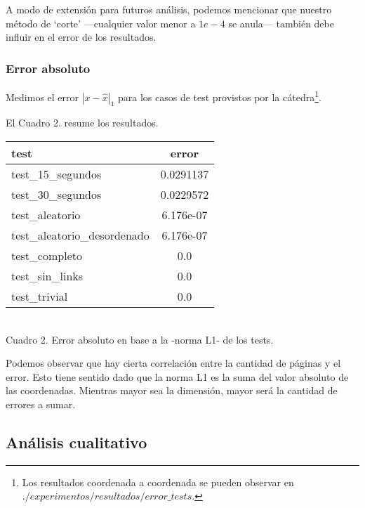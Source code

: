 \vspace{1em}
A modo de extensión para futuros análisis, podemos mencionar que nuestro método de `corte' ---cualquier valor menor a $1e-4$ se anula--- también debe influir en el error de los resultados. 


\vspace{2em}
\subsubsection{Error absoluto} Medimos el error $|x - \hat{x}|_1$ para los casos de test provistos por la cátedra\footnote{Los resultados coordenada a coordenada se pueden observar en $./experimentos/resultados/error\_tests$.}. 
\vspace{1em}

\noindent El Cuadro 2. resume los resultados.
\vspace{1.5em}

\begin{center}
    \begin{tabular}{ |l|c| } 
    \hline
    test                         & error        \\
    \hline
    test\_15\_segundos           & 0.0291137    \\
    test\_30\_segundos           & 0.0229572    \\
    test\_aleatorio              & 6.176e-07    \\
    test\_aleatorio\_desordenado & 6.176e-07    \\
    test\_completo               & 0.0          \\
    test\_sin\_links             & 0.0          \\
    test\_trivial                & 0.0          \\
    \hline
    \end{tabular} \\
    \bigskip
    Cuadro 2. Error absoluto en base a la -norma L1- de los tests. 
\end{center}
\vspace{1em}

Podemos observar que hay cierta correlación entre la cantidad de páginas y el error. Esto tiene sentido dado que la norma L1 es la suma del valor absoluto de las coordenadas. Mientras mayor sea la dimensión, mayor será la cantidad de errores a sumar.


\vspace{2em}
\subsection{Análisis cualitativo}